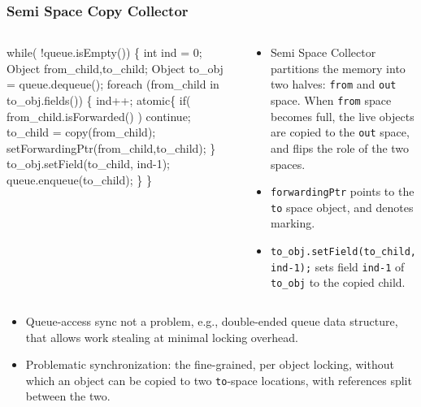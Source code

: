 \documentclass{beamer}
\newcommand{\emphh}[1]{\textcolor{CosGreen}{ #1}}
\begin{document}
\begin{frame}[fragile,t]
  \frametitle{Semi Space Copy Collector}

\begin{columns}
\begin{colorcode}
while(\emphh{!queue.isEmpty()}) \{
  int ind = 0;
  Object from_child,to_child;
  Object to_obj = \emphh{queue.dequeue()};
  foreach (from_child in to_obj.fields()) \{
    ind++;
    \alert{atomic}\{ 
      if( from_child.isForwarded() ) 
        continue;
      to_child = copy(from_child);
      setForwardingPtr(from_child,to_child); 
    \}
    to_obj.setField(to_child, ind-1);
    \emphh{queue.enqueue(to_child);}
\} \}
\end{colorcode}
\begin{scriptsize}
\begin{itemize}
    \item Semi Space Collector partitions the memory into
            two halves: {\tt from} and {\tt out} space.
          When {\tt from} space becomes full, the live objects
            are copied to the {\tt out} space, and flips
            the role of the two spaces.\pause
    \item {\tt forwardingPtr} points to the {\tt to} space
            object, and denotes marking. 
    \item {\tt to\_obj.setField(to\_child, ind-1);} sets
            field {\tt ind-1} of {\tt to\_obj} to the
            copied child.
\end{itemize}
\end{scriptsize}
\end{columns}

\begin{itemize}
    \item Queue-access sync not a problem,
            e.g., double-ended queue data structure, that
            allows work stealing at minimal locking
            overhead.
    \item \alert{Problematic synchronization}: the fine-grained,
            per object locking, without which an object can
            be copied to two {\tt to}-space locations, with
            references split between the two.
\end{itemize}

\end{frame}
\end{document}
